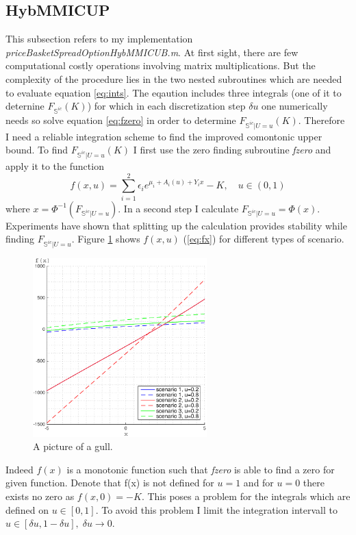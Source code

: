 \documentclass[a4paper]{article}
\begin{document}
\subsection{HybMMICUP}
This subsection refers to my implementation \emph{priceBasketSpreadOptionHybMMICUB.m}. At first sight, there are few computational costly operations involving matrix multiplications. But the complexity of the procedure lies in the two nested subroutines which are needed to evaluate equation \ref{eq:ints}. The eqaution includes three integrals (one of it to deternine $F_{\mathbb{S}^{ic}}(K)$) for which in each discretization step $\delta u$ one numerically needs so solve equation \ref{eq:fzero} in order to determine $F_{\mathbb{S}^{ic}|U=u}(K)$. Therefore I need a reliable integration scheme to find the improved comontonic upper bound. To find $F_{\mathbb{S}^{ic}|U=u}(K)$ I first use the zero finding subroutine \textit{fzero} and apply it to the function
\begin{equation}
\label{eq:fx}
f(x,u) = \sum_{i=1}^2\epsilon_ie^{\mu_i+A_i(u)+Y_ix}-K, \quad u\in(0,1)
\end{equation}
where $x = \Phi^{-1}(F_{\mathbb{S}^{ic}|U=u})$. In a second step I calculate $F_{\mathbb{S}^{ic}|U=u}=\Phi(x)$. Experiments have shown that splitting up the calculation provides stability while finding $F_{\mathbb{S}^{ic}|U=u}$. 
Figure \ref{fig:fx} shows $f(x,u)$ (\ref{eq:fx}) for different types of scenario. 
\begin{figure}[h!]
	\centering
	\includegraphics[width=0.6\textwidth]{graphics/fx_noTitle.pdf}
	\caption{A picture of a gull.}
	\label{fig:fx}
\end{figure}
Indeed $f(x)$ is a monotonic function such that \textit{fzero} is able to find a zero for given function. Denote that f(x) is not defined for $u=1$ and for $u=0$ there exists no zero as $f(x,0)=-K$. This poses a problem for the integrals which are defined on $u\in[0,1]$. To avoid this problem I limit the integration intervall to $u\in[\delta u,1-\delta u],\; \delta u \rightarrow 0.$\\
\end{document}
